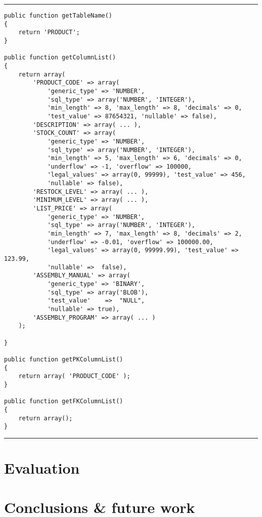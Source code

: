 \documentclass[sigconf, authordraft]{acmart}
\begin{document}
\begin{table}
    \footnotesize
    \hrule
    \begin{verbatim}
public function getTableName()
{
    return 'PRODUCT';
}

public function getColumnList()
{
    return array(
        'PRODUCT_CODE' => array(
            'generic_type' => 'NUMBER',
            'sql_type' => array('NUMBER', 'INTEGER'),
            'min_length' => 8, 'max_length' => 8, 'decimals' => 0,
            'test_value' => 87654321, 'nullable' => false),
        'DESCRIPTION' => array( ... ),
        'STOCK_COUNT' => array(
            'generic_type' => 'NUMBER',
            'sql_type' => array('NUMBER', 'INTEGER'),
            'min_length' => 5, 'max_length' => 6, 'decimals' => 0,
            'underflow' => -1, 'overflow' => 100000,
            'legal_values' => array(0, 99999), 'test_value' => 456,
            'nullable' => false),
        'RESTOCK_LEVEL' => array( ... ),
        'MINIMUM_LEVEL' => array( ... ),
        'LIST_PRICE' => array(
            'generic_type' => 'NUMBER',
            'sql_type' => array('NUMBER', 'INTEGER'),
            'min_length' => 7, 'max_length' => 8, 'decimals' => 2,
            'underflow' => -0.01, 'overflow' => 100000.00,
            'legal_values' => array(0, 99999.99), 'test_value' => 123.99,
            'nullable' =>  false),
        'ASSEMBLY_MANUAL' => array(
            'generic_type' => 'BINARY',
            'sql_type' => array('BLOB'),
            'test_value'    =>  "NULL",
            'nullable' => true),
        'ASSEMBLY_PROGRAM' => array( ... )
    );

}

public function getPKColumnList()
{
    return array( 'PRODUCT_CODE' );
}

public function getFKColumnList()
{
    return array();
}
    \end{verbatim}
    \hrule
    \caption{Example of table specification}
\end{table}

\section{Evaluation}
\label{sec-evaluation}

\section{Conclusions \& future work}
\label{sec-conclusion}

\newpage


\end{document}
